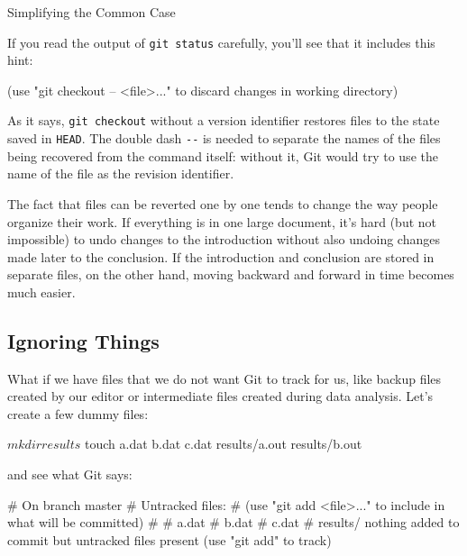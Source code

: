 
\begin{swcbox}{Simplifying the Common Case}

If you read the output of \texttt{git status} carefully, you'll see that
it includes this hint:

\begin{VerbOut}
(use "git checkout -- <file>..." to discard changes in working directory)
\end{VerbOut}

As it says, \texttt{git checkout} without a version identifier restores
files to the state saved in \texttt{HEAD}. The double dash \texttt{-{}-}
is needed to separate the names of the files being recovered from the
command itself: without it, Git would try to use the name of the file as
the revision identifier.

\end{swcbox}

The fact that files can be reverted one by one tends to change the way
people organize their work. If everything is in one large document, it's
hard (but not impossible) to undo changes to the introduction without
also undoing changes made later to the conclusion. If the introduction
and conclusion are stored in separate files, on the other hand, moving
backward and forward in time becomes much easier.

\subsection*{Ignoring Things}

What if we have files that we do not want Git to track for us, like
backup files created by our editor or intermediate files created during
data analysis. Let's create a few dummy files:

\begin{VerbIn}
$ mkdir results
$ touch a.dat b.dat c.dat results/a.out results/b.out
\end{VerbIn}

and see what Git says:


\begin{VerbOut}
# On branch master
# Untracked files:
#   (use "git add <file>..." to include in what will be committed)
#
#   a.dat
#   b.dat
#   c.dat
#   results/
nothing added to commit but untracked files present (use "git add" to track)
\end{VerbOut}

